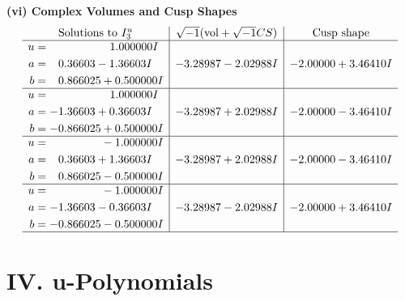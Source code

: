 \documentclass[1p]{elsarticle_modified}
\theoremstyle{definition}
\newcommand{\I}{\sqrt{-1}}
\begin{document}
\newpage\flushleft \textbf{(vi) Complex Volumes and Cusp Shapes}
$$\begin{array}{c|c|c}  
\text{Solutions to }I^u_{3}& \I (\text{vol} + \sqrt{-1}CS) & \text{Cusp shape}\\
 \hline 
\begin{aligned}
u &= \phantom{-0.000000 -}1.000000 I \\
a &= \phantom{-}0.36603 - 1.36603 I \\
b &= \phantom{-}0.866025 + 0.500000 I\end{aligned}
 & -3.28987 - 2.02988 I & -2.00000 + 3.46410 I \\ \hline\begin{aligned}
u &= \phantom{-0.000000 -}1.000000 I \\
a &= -1.36603 + 0.36603 I \\
b &= -0.866025 + 0.500000 I\end{aligned}
 & -3.28987 + 2.02988 I & -2.00000 - 3.46410 I \\ \hline\begin{aligned}
u &= \phantom{-0.000000 } -1.000000 I \\
a &= \phantom{-}0.36603 + 1.36603 I \\
b &= \phantom{-}0.866025 - 0.500000 I\end{aligned}
 & -3.28987 + 2.02988 I & -2.00000 - 3.46410 I \\ \hline\begin{aligned}
u &= \phantom{-0.000000 } -1.000000 I \\
a &= -1.36603 - 0.36603 I \\
b &= -0.866025 - 0.500000 I\end{aligned}
 & -3.28987 - 2.02988 I & -2.00000 + 3.46410 I\\
 \hline 
 \end{array}$$\newpage
\newpage\renewcommand{\arraystretch}{1}
\centering \section*{ IV. u-Polynomials}
\end{document}
